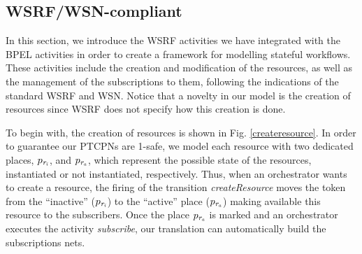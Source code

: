\subsection*{WSRF/WSN-compliant}
In this section, we introduce the WSRF activities we have integrated with the BPEL activities in order to create a framework for modelling stateful workflows. 
These activities include the creation and modification of the resources, as well as the management of the subscriptions to them, following the indications of the standard WSRF and WSN. Notice that a novelty in our model is the creation of resources since WSRF does not specify how this creation is done.

To begin with, the creation of resources is shown in Fig. \ref{createresource}. In order to guarantee our PTCPNs are 1-safe, we model each resource with two dedicated places,  $p_{\it r_i}$, and $p_{\it r_a}$, which represent the possible state of the resources, instantiated or not instantiated, respectively. Thus, when an orchestrator wants to create a resource, the firing of the transition {\it createResource} moves the token from the ``inactive'' ($p_{\it r_i}$) to the ``active'' place ($p_{\it r_a}$) making available this resource to the subscribers. Once the place $p_{\it r_a}$ is marked and an orchestrator executes the activity {\em subscribe}, our translation can automatically build the subscriptions nets. 

